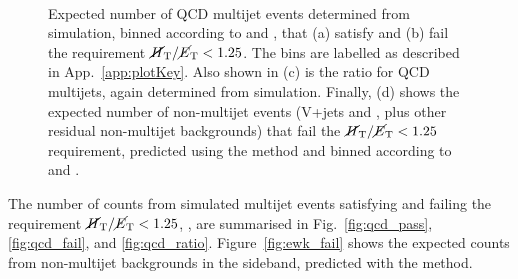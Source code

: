 \begin{figure}[!h]
{   %
  } \\
  \caption{Expected number of QCD multijet events determined from
    simulation, binned according to \njet and \scalht, that (a) satisfy
    and (b) fail the requirement $\mbox{$\mbox{$\cancel{H}_\text{T}$} / \mbox{$\cancel{E}_\text{T}$}$} < 1.25$. The bins are
    labelled as described in App.~\ref{app:plotKey}. Also shown in (c)
    is the ratio \rmhtmet for QCD multijets, again determined from
    simulation. Finally, (d) shows the expected number of non-multijet
    events (V+jets and \ttbar, plus other residual non-multijet
    backgrounds) that fail the $\mbox{$\mbox{$\cancel{H}_\text{T}$} / \mbox{$\cancel{E}_\text{T}$}$} < 1.25$ requirement, predicted
    using the \TF method and binned according to \njet and \scalht.}
  \label{fig:qcd_plots}
\end{figure}

The number of counts from simulated \QCD multijet events satisfying and failing the
requirement $\mbox{$\mbox{$\cancel{H}_\text{T}$} / \mbox{$\cancel{E}_\text{T}$}$} < 1.25$, \rmhtmet, are
summarised in Fig.~\ref{fig:qcd_pass}, \ref{fig:qcd_fail}, and
\ref{fig:qcd_ratio}. Figure~\ref{fig:ewk_fail} shows the expected
counts from non-multijet backgrounds in the \mhtmet sideband,
predicted with the \TF method.

